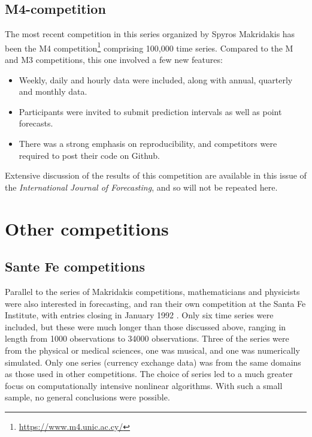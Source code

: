 \documentclass[11pt,a4paper,]{article}
\providecommand{\tightlist}{%
  \setlength{\itemsep}{0pt}\setlength{\parskip}{0pt}}
\begin{document}
\hypertarget{m4-competition}{%
\subsection*{M4-competition}\label{m4-competition}}

The most recent competition in this series organized by Spyros Makridakis has been the M4 competition\footnote{\url{https://www.m4.unic.ac.cy/}} comprising 100,000 time series. Compared to the M and M3 competitions, this one involved a few new features:

\begin{itemize}
\tightlist
\item
  Weekly, daily and hourly data were included, along with annual, quarterly and monthly data.
\item
  Participants were invited to submit prediction intervals as well as point forecasts.
\item
  There was a strong emphasis on reproducibility, and competitors were required to post their code on Github.
\end{itemize}

Extensive discussion of the results of this competition are available in this issue of the \emph{International Journal of Forecasting}, and so will not be repeated here.

\hypertarget{sec:other}{%
\section{Other competitions}\label{sec:other}}

\hypertarget{sante-fe-competitions}{%
\subsection*{Sante Fe competitions}\label{sante-fe-competitions}}

Parallel to the series of Makridakis competitions, mathematicians and physicists were also interested in forecasting, and ran their own competition at the Santa Fe Institute, with entries closing in January 1992 \autocite{GW1993}. Only six time series were included, but these were much longer than those discussed above, ranging in length from 1000 observations to 34000 observations. Three of the series were from the physical or medical sciences, one was musical, and one was numerically simulated. Only one series (currency exchange data) was from the same domains as those used in other competitions. The choice of series led to a much greater focus on computationally intensive nonlinear algorithms. With such a small sample, no general conclusions were possible.
\end{document}
